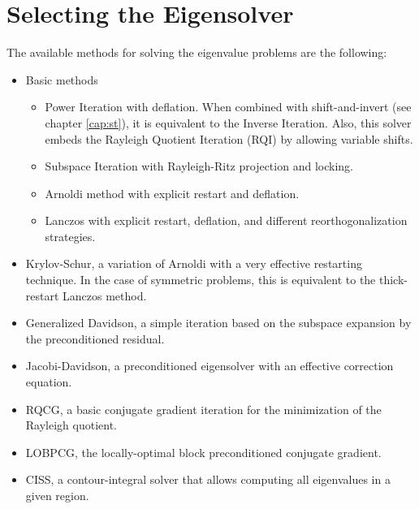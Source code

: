 \section{Selecting the Eigensolver}

	The available methods for solving the eigenvalue problems are the following:
\begin{itemize}
\setlength{\itemsep}{0pt}
\item Basic methods
\begin{itemize}
\setlength{\itemsep}{-1pt}
\item Power Iteration with deflation. When combined with shift-and-invert (see chapter \ref{cap:st}), it is equivalent to the Inverse Iteration. Also, this solver embeds the Rayleigh Quotient Iteration (RQI) by allowing variable shifts.
\item Subspace Iteration with Rayleigh-Ritz projection and locking.
\item Arnoldi method with explicit restart and deflation.
\item Lanczos with explicit restart, deflation, and different reorthogonalization strategies.
\end{itemize}
\item Krylov-Schur, a variation of Arnoldi with a very effective restarting technique. In the case of symmetric problems, this is equivalent to the thick-restart Lanczos method.
\item Generalized Davidson, a simple iteration based on the subspace expansion by the preconditioned residual.
\item Jacobi-Davidson, a preconditioned eigensolver with an effective correction equation.
\item RQCG, a basic conjugate gradient iteration for the minimization of the Rayleigh quotient.
\item LOBPCG, the locally-optimal block preconditioned conjugate gradient.
\item CISS, a contour-integral solver that allows computing all eigenvalues in a given region.
\end{itemize}

